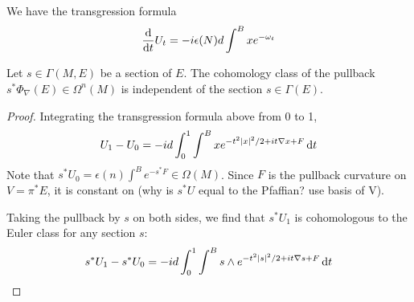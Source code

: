 \begin{comment} %
Let $E=P\times_\rho V$ be the associated bundle to $P$ with rank $2m$. 
basic forms on $P\times V$ are in correspondence with forms on  $E$.

A representative for the Thom class, called the Mathai-Quillen Thom form, is
given by
\begin{equation} \label{eq:mathai_quillen}
\Phi_\nabla(E) = \frac{1}{(2\pi)^m} e^{-v_a^2/2} \int \odif{\chi} 
\exp(\chi_a\Omega^{ab}\chi_b /2 + i\nabla v^a \chi_a)
\end{equation}
where $v^a \in \Omega^0(P\times V)$ are coordinates on $V$, and $\nabla v^a \in
\Omega^1(P\times V)$ is the exterior covariant derivative of $v^a$.
Not well defined globally, since using trivialisation to use coordinates? 

We claim that this defines a basic form in $\Omega^{2m}_\rho(P\times V)$,
and that it is a representative of the Thom class. 

To show that it is a basic form, we need to prove it is horizontal and $\rho$
equivariant.  

To show that is is a representative of the Thom class, we need to prove it is
closed and satisfies  $\pi^*\Phi_\nabla(E) = 1$.

Pullback by zero section is Pfaffian.
\end{comment} 

\begin{prop} %
	We have the transgression formula
	\[
	\odv{}{t} U_t = -i\epsilon(N) d\int^B x e^{-\omega_t}
	\] 
\end{prop}
\begin{prop} \label{prop:thom_pullback}
	Let $s\in \Gamma(M,E)$ be a section of $E$.
	The cohomology class of the pullback $s^*\Phi_\nabla(E) \in \Omega^{n}(M)$
	is independent of the section  $s\in\Gamma(E)$.
\end{prop}
\begin{proof}
	Integrating the transgression formula above from 0 to 1, 
	\[
		U_1 - U_0 = -id\int_0^1\int^B x e^{-t^2\abs{x}^2/2 +
		it\nabla x + F} \odif{t}
	\] 
	Note that $s^*U_0 = \epsilon(n)\int^B e^{-s^*F} \in \Omega(M)$. Since $F$ is
	the pullback curvature on $V = \pi^*E$, it is constant on 
	(why is $s^*U$ equal to the Pfaffian? use basis of V).

	Taking the pullback by $s$ on both sides, we find that $s^*U_1$ is
	cohomologous to the Euler class for any section $s$:  
	\[
		s^*U_1 - s^*U_0 = -id\int_0^1\int^B s\wedge e^{-t^2\abs{s}^2/2 +
		it\nabla s + F} \odif{t}
	\] 
\end{proof}



